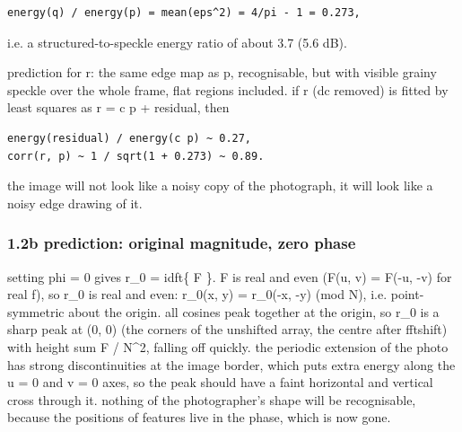 \begin{verbatim}
energy(q) / energy(p) = mean(eps^2) = 4/pi - 1 = 0.273,
\end{verbatim}

i.e. a structured-to-speckle energy ratio of about 3.7 (5.6 dB).

prediction for r: the same edge map as p, recognisable, but with visible grainy speckle over the whole frame, flat regions included. if r (dc removed) is fitted by least squares as r = c p + residual, then

\begin{verbatim}
energy(residual) / energy(c p) ~ 0.27,
corr(r, p) ~ 1 / sqrt(1 + 0.273) ~ 0.89.
\end{verbatim}

the image will not look like a noisy copy of the photograph, it will look like a noisy edge drawing of it.

\subsubsection*{1.2b prediction: original magnitude, zero phase}

setting phi = 0 gives r\_0 = idft\{ \textbar{}F\textbar{} \}. \textbar{}F\textbar{} is real and even (\textbar{}F(u, v)\textbar{} = \textbar{}F(-u, -v)\textbar{} for real f), so r\_0 is real and even: r\_0(x, y) = r\_0(-x, -y) (mod N), i.e. point-symmetric about the origin. all cosines peak together at the origin, so r\_0 is a sharp peak at (0, 0) (the corners of the unshifted array, the centre after fftshift) with height sum \textbar{}F\textbar{} / N\textasciicircum{}2, falling off quickly. the periodic extension of the photo has strong discontinuities at the image border, which puts extra energy along the u = 0 and v = 0 axes, so the peak should have a faint horizontal and vertical cross through it. nothing of the photographer's shape will be recognisable, because the positions of features live in the phase, which is now gone.
